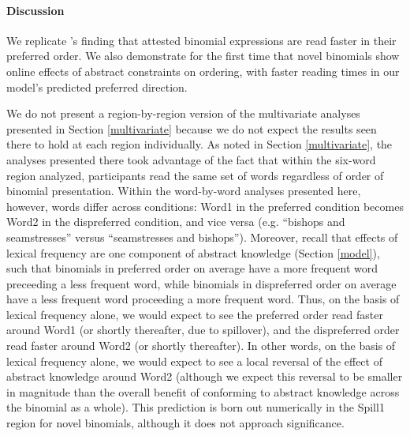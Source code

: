 \documentclass[authoryear]{elsarticle}
\begin{document}
\paragraph{Discussion}
We replicate \citeauthor{SiyanovaChanturia:2011ep}'s \citeyearpar{SiyanovaChanturia:2011ep} finding that attested binomial expressions are read faster in their preferred order. We also demonstrate for the first time that novel binomials show online effects of abstract constraints on ordering, with faster reading times in our model's predicted preferred direction.

We do not present a region-by-region version of the multivariate analyses presented in Section \ref{multivariate} because we do not expect the results seen there to hold at each region individually. As noted in Section \ref{multivariate}, the analyses presented there took advantage of the fact that within the six-word region analyzed, participants read the same set of words regardless of order of binomial presentation. Within the word-by-word analyses presented here, however, words differ across conditions: Word1 in the preferred condition becomes Word2 in the dispreferred condition, and vice versa (e.g. ``bishops and seamstresses'' versus ``seamstresses and bishops''). Moreover, recall that effects of lexical frequency are one component of abstract knowledge (Section \ref{model}), such that binomials in preferred order on average have a more frequent word preceeding a less frequent word, while binomials in dispreferred order on average have a less frequent word proceeding a more frequent word. Thus, on the basis of lexical frequency alone, we would expect to see the preferred order read faster around Word1 (or shortly thereafter, due to spillover), and the dispreferred order read faster around Word2 (or shortly thereafter). In other words, on the basis of lexical frequency alone, we would expect to see a local reversal of the effect of abstract knowledge around Word2 (although we expect this reversal to be smaller in magnitude than the overall benefit of conforming to abstract knowledge across the binomial as a whole). This prediction is born out numerically in the Spill1 region for novel binomials, although it does not approach significance.

%
\end{document}
